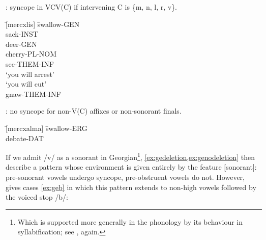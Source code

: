 \begin{example}\label{ex:gedeletion} : syncope in VCV(C) if intervening C is \{m, n, l, r, v\}. \citep{Butskh2002,Butskh2001}
\begin{tabbing}

   \tab[2cm] \= [mercxlis] \tab[2cm] \= swallow-{\sc\scriptsize GEN}\\
   \tab[2cm] \> [tʼomrit] \tab[2cm] \> sack-{\sc\scriptsize INST}\\
   \> [ʃvlis] \> deer-{\sc\scriptsize GEN}\\
         \> [blebi] \> cherry-{\sc\scriptsize PL}-{\sc\scriptsize NOM}\\
         \> [xedva] \> see-{\sc\scriptsize THEM}-{\sc\scriptsize INF}\\
    \> `you will arrest'\\
   \> [gatʃʼri] \> `you will cut'\\
         \> [xvra]\footnotemark \> gnaw-{\sc\scriptsize THEM}-{\sc\scriptsize INF}
    \end{tabbing}
\end{example}


\begin{example}\label{ex:genodeletion} : no syncope for non-V(C) affixes or non-sonorant finals.
\begin{tabbing}
   \tab[2cm] \= [mercxalma] \tab[2cm] \= swallow-{\sc\scriptsize ERG} \\
   \> [kʼamatis] \> debate-{\sc\scriptsize DAT}
    \end{tabbing}
\end{example}

If we admit /v/ as a sonorant in Georgian\footnote{Which is supported more generally in the phonology by its behaviour in syllabification; see \cite{Butskh2001,Butskh2002}, again.}, \cref{ex:gedeletion,ex:genodeletion} then describe a pattern whose environment is given entirely by the feature [sonorant]: pre-sonorant vowels undergo syncope, pre-obstruent vowels do not. However, \citeauthor{Butskh2002} gives cases \cref{ex:geb} in which this pattern extends to non-high vowels followed by the voiced stop /b/:

